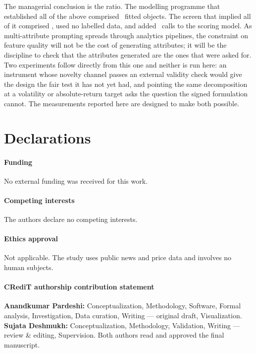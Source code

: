 \documentclass[preprint,12pt,authoryear]{elsarticle}
\theoremstyle{plain}
\theoremstyle{remark}
\newif\ifblind
\begin{document}
The managerial conclusion is the ratio. The modelling programme that established
all of the above comprised \DownstreamTotal\ fitted objects. The screen that
implied all of it comprised \ScreenTotal, used no labelled data, and added
\ScreenModelCalls\ calls to the scoring model. As multi-attribute prompting
spreads through analytics pipelines, the constraint on feature quality will not
be the cost of generating attributes; it will be the discipline to check that the
attributes generated are the ones that were asked for. Two experiments follow
directly from this one and neither is run here: an instrument whose novelty
channel passes an external validity check would give the design the fair test it
has not yet had, and pointing the same decomposition at a volatility or
absolute-return target asks the question the signed formulation cannot. The
measurements reported here are designed to make both possible.

\section*{Declarations}

\paragraph{Funding} No external funding was received for this work.

\paragraph{Competing interests} The authors declare no competing interests.

\paragraph{Ethics approval} Not applicable. The study uses public news and price
data and involves no human subjects.

\paragraph{CRediT authorship contribution statement}
\ifblind
Author contributions are withheld for double-blind review and will be supplied
on acceptance.
\else
\textbf{Anandkumar Pardeshi:} Conceptualization, Methodology, Software, Formal
analysis, Investigation, Data curation, Writing --- original draft,
Visualization. \textbf{Sujata Deshmukh:} Conceptualization, Methodology,
Validation, Writing --- review \& editing, Supervision. Both authors read and
approved the final manuscript.
\fi
\end{document}
